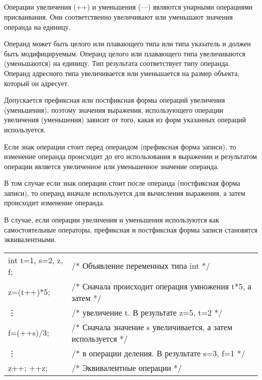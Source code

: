 \subsection{}

Операции увеличения (++) и уменьшения ({--}{--}) являются унарными операциями присваивания. Они соответственно увеличивают или уменьшают значения операнда на единицу. 

Операнд может быть целого или плавающего типа или типа указатель и должен быть модифицируемым. Операнд целого или плавающего типа увеличиваются (уменьшаются) на единицу. Тип результата соответствует типу операнда. Операнд адресного типа увеличивается или уменьшается на размер объекта, который он адресует. \killoverfullbefore

Допускается префиксная или постфиксная формы операций увеличения (уменьшения), поэтому значения выражения, использующего операции увеличения (уменьшения) зависит от того, какая из форм указанных операций используется. \killoverfullbefore

Если знак операции стоит перед операндом (префиксная форма записи), то изменение операнда происходит до его использования в выражении и результатом операции является увеличенное или уменьшенное значение операнда. \killoverfullbefore

В том случае если знак операции стоит после операнда (постфиксная форма записи), то операнд вначале используется для вычисления выражения, а затем происходит изменение операнда. \killoverfullbefore 

В случае, если операции увеличения и уменьшения используются как самостоятельные операторы, префиксная и постфиксная формы записи становятся эквивалентными. \killoverfullbefore \BL

\begin{pExample}
\begin{tabular}{ l l }
int t=1, s=2, z, f; & \textcolor{exComm}{/* Объявление переменных типа int */} \\
z=(t++)*5; & \textcolor{exComm}{/* Сначала происходит операция умножения t*5, а затем   */} \\
\vdots & \textcolor{exComm}{/* увеличение t. В результате z=5, t=2 */} \\
f=(++s)/3; & \textcolor{exComm}{/* Сначала значение s увеличивается, а затем используется  */} \\
\vdots & \textcolor{exComm}{/* в операции деления. В результате s=3, f=1 */} \\
z++; ++z;  & \textcolor{exComm}{/* Эквивалентные операции */} \\
\end{tabular}
\end{pExample}


